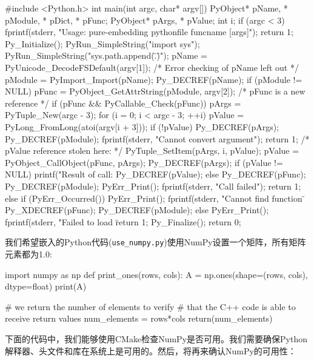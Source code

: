 \begin{codebox}[cpp]
#include <Python.h>
int main(int argc, char* argv[]) {
  PyObject* pName, * pModule, * pDict, * pFunc;
  PyObject* pArgs, * pValue;
  int i;
  if (argc < 3) {
    fprintf(stderr, "Usage: pure-embedding pythonfile funcname [args]\n");
    return 1;
  }
  Py_Initialize();
  PyRun_SimpleString("import sys");
  PyRun_SimpleString("sys.path.append(\".\")");
  pName = PyUnicode_DecodeFSDefault(argv[1]);
  /* Error checking of pName left out */
  pModule = PyImport_Import(pName);
  Py_DECREF(pName);
  if (pModule != NULL) {
    pFunc = PyObject_GetAttrString(pModule, argv[2]);
    /* pFunc is a new reference */
    if (pFunc && PyCallable_Check(pFunc)) {
      pArgs = PyTuple_New(argc - 3);
      for (i = 0; i < argc - 3; ++i) {
        pValue = PyLong_FromLong(atoi(argv[i + 3]));
        if (!pValue) {
          Py_DECREF(pArgs);
          Py_DECREF(pModule);
          fprintf(stderr, "Cannot convert argument\n");
          return 1;
        }
        /* pValue reference stolen here: */
        PyTuple_SetItem(pArgs, i, pValue);
      }
      pValue = PyObject_CallObject(pFunc, pArgs);
      Py_DECREF(pArgs);
      if (pValue != NULL) {
        printf("Result of call: %
        Py_DECREF(pValue);
      }
      else {
        Py_DECREF(pFunc);
        Py_DECREF(pModule);
        PyErr_Print();
        fprintf(stderr, "Call failed\n");
        return 1;
      }
    }
    else {
      if (PyErr_Occurred())
        PyErr_Print();
      fprintf(stderr, "Cannot find function \"%
    }
    Py_XDECREF(pFunc);
    Py_DECREF(pModule);
  }
  else {
    PyErr_Print();
    fprintf(stderr, "Failed to load \"%
    return 1;
  }
  Py_Finalize();
  return 0;
}
\end{codebox}

我们希望嵌入的Python代码(\texttt{use\_numpy.py})使用NumPy设置一个矩阵，所有矩阵元素都为1.0:

\begin{codebox}[python]
import numpy as np
def print_ones(rows, cols):
  A = np.ones(shape=(rows, cols), dtype=float)
  print(A)
  
  # we return the number of elements to verify
  # that the C++ code is able to receive return values
  num_elements = rows*cols
  return(num_elements)
\end{codebox}


下面的代码中，我们能够使用CMake检查NumPy是否可用。我们需要确保Python解释器、头文件和库在系统上是可用的。然后，将再来确认NumPy的可用性：

